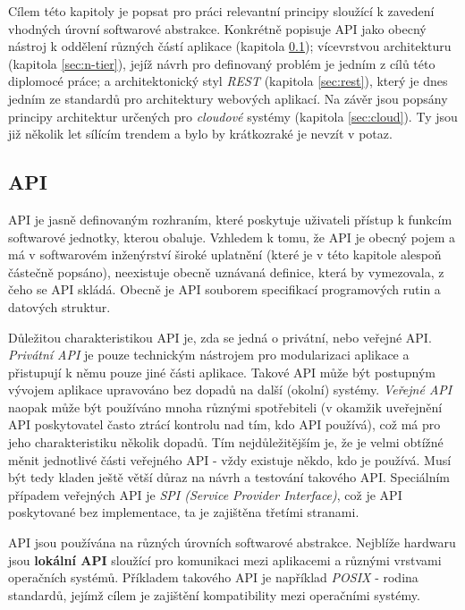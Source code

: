 Cílem této kapitoly je popsat pro práci relevantní principy sloužící k zavedení vhodných úrovní softwarové abstrakce. Konkrétně popisuje API jako obecný nástroj k oddělení různých částí aplikace (kapitola \ref{sec:api}); vícevrstvou architekturu (kapitola \ref{sec:n-tier}), jejíž návrh pro definovaný problém je jedním z cílů této diplomocé práce; a architektonický styl \textit{REST} (kapitola \ref{sec:rest}), který je dnes jedním ze standardů pro architektury webových aplikací. Na závěr jsou popsány principy architektur určených pro \textit{cloudové} systémy (kapitola \ref{sec:cloud}). Ty jsou již několik let sílícím trendem a bylo by krátkozraké je nevzít v potaz.

\subsection{API}
\label{sec:api}
API je jasně definovaným rozhraním, které poskytuje uživateli přístup k funkcím softwarové jednotky, kterou obaluje. Vzhledem k tomu, že API je obecný pojem a má v softwarovém inženýrství široké uplatnění (které je v této kapitole alespoň částečně popsáno), neexistuje obecně uznávaná definice, která by vymezovala, z čeho se API skládá. Obecně je API souborem specifikací programových rutin a datových struktur.

Důležitou charakteristikou API je, zda se jedná o privátní, nebo veřejné API. \textit{Privátní API} je pouze technickým nástrojem pro modularizaci aplikace a přistupují k němu pouze jiné části aplikace. Takové API může být postupným vývojem aplikace upravováno bez dopadů na další (okolní) systémy. \textit{Veřejné API} naopak může být používáno mnoha různými spotřebiteli (v okamžik uveřejnění API poskytovatel často ztrácí kontrolu nad tím, kdo API používá), což má pro jeho charakteristiku několik dopadů. Tím nejdůležitějším je, že je velmi obtížné měnit jednotlivé části veřejného API - vždy existuje někdo, kdo je používá. Musí být tedy kladen ještě větší důraz na návrh a testování takového API. Speciálním případem veřejných API je \textit{SPI (Service Provider Interface)}, což je API poskytované bez implementace, ta je zajištěna třetími stranami.

API jsou používána na různých úrovních softwarové abstrakce. Nejblíže hardwaru jsou \textbf{lokální API} sloužící pro komunikaci mezi aplikacemi a různými vrstvami operačních systémů. Příkladem takového API je například \textit{POSIX} \cite{Posix} - rodina standardů, jejímž cílem je zajištění kompatibility mezi operačními systémy.


